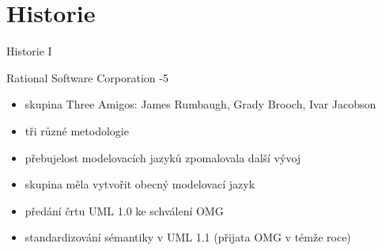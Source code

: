 \section{Historie}




\begin{frame}{Historie I}

\onslide<+->Rational Software Corporation 
\newline
{}-5 
\begin{itemize}
    \item skupina Three Amigos: James Rumbaugh, Grady Brooch, Ivar Jacobson
    \item<+->tři různé metodologie
\end{itemize}                     

\begin{itemize}
    \item přebujelost modelovacích jazyků zpomalovala další vývoj
    \item<+->skupina měla vytvořit obecný modelovací jazyk
\end{itemize}      

\begin{itemize}
    \item předání črtu UML 1.0 ke schválení OMG
    \item<+->standardizování sémantiky v UML 1.1 (přijata OMG v témže roce)
\end{itemize}         
	
\end{frame}


